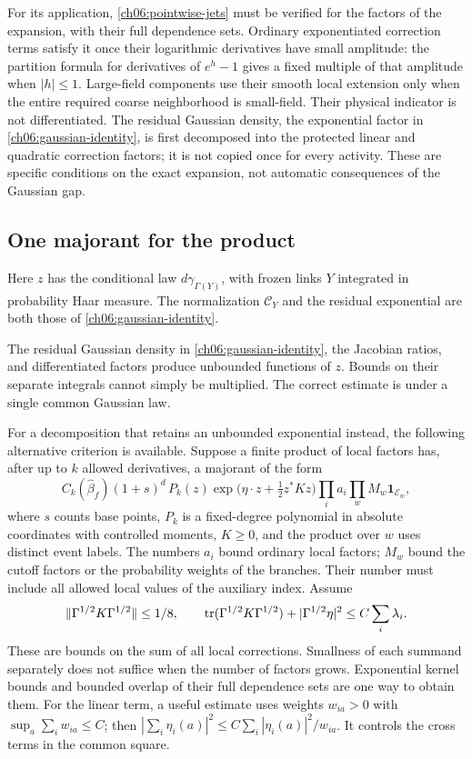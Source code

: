 For its application, \eqref{ch06:pointwise-jets} must be verified for the
factors of the expansion, with their full dependence sets. Ordinary
exponentiated correction terms satisfy it once their logarithmic
derivatives have small amplitude: the partition formula for derivatives
of $e^h-1$ gives a fixed multiple of that amplitude when $|h|\le1$.
Large-field components use their smooth local extension only when the
entire required coarse neighborhood is small-field. Their physical
indicator is not differentiated. The residual Gaussian density, the exponential factor in \eqref{ch06:gaussian-identity}, is first
decomposed into the protected linear and quadratic correction
factors; it is not copied once for every activity. These are specific
conditions on the exact expansion, not automatic consequences of the
Gaussian gap.

\subsection{One majorant for the product}

Here $z$ has the conditional law $d\gamma_{\Gamma(Y)}$, with frozen links $Y$ integrated in probability Haar measure. The normalization $\mathcal C_Y$ and the residual exponential are both those of \eqref{ch06:gaussian-identity}.

The residual Gaussian density in \eqref{ch06:gaussian-identity}, the
Jacobian ratios, and differentiated factors produce unbounded functions
of $z$. Bounds on their separate integrals cannot simply be multiplied.
The correct estimate is under a single common Gaussian law.

For a decomposition that retains an unbounded exponential instead, the following alternative criterion is available. Suppose a finite product of
local factors has, after up to $k$ allowed derivatives, a majorant of the
form
\begin{equation}
 C_k(\widehat\beta_f)(1+s)^d\,P_k(z)
       \exp\bigl(\eta\cdot z+\tfrac12z^*Kz\bigr)
       \prod_i a_i\prod_w M_w\mathbf1_{\mathcal E_w},
 \label{ch06:majorant-form}
\end{equation}
where $s$ counts base points, $P_k$ is a fixed-degree polynomial in absolute
coordinates with controlled moments, $K\ge0$, and the product over $w$
uses distinct event labels. The numbers $a_i$ bound ordinary local factors;
$M_w$ bound the cutoff factors or the probability weights of the branches. Their number must
include all allowed local values of the auxiliary index. Assume
\begin{equation}
 \|\Gamma^{1/2}K\Gamma^{1/2}\|\le1/8,
 \qquad \operatorname{tr}(\Gamma^{1/2}K\Gamma^{1/2})
              +|\Gamma^{1/2}\eta|^2\le C\sum_i\lambda_i.
 \label{ch06:quadratic-control}
\end{equation}
These are bounds on the sum of all local corrections. Smallness of each
summand separately does not suffice when the number of factors grows.
Exponential kernel bounds and bounded overlap of their full dependence sets
are one way to obtain them. For the linear term, a useful estimate
uses weights $w_{ia}>0$ with $\sup_a\sum_iw_{ia}\le C$; then
$|\sum_i\eta_i(a)|^2\le C\sum_i|\eta_i(a)|^2/w_{ia}$.
It controls the cross terms in the common square.

